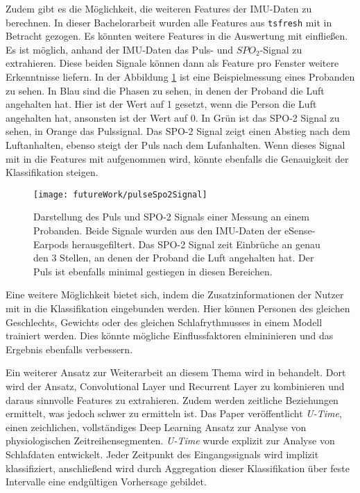 Zudem gibt es die Möglichkeit, die weiteren Features der IMU-Daten zu berechnen.
In dieser Bachelorarbeit wurden alle Features aus \texttt{tsfresh} mit in Betracht gezogen. 
Es könnten weitere Features in die Auswertung mit einfließen.
Es ist möglich, anhand der IMU-Daten das Puls- und $SPO_2$-Signal zu extrahieren. 
Diese beiden Signale können dann als Feature pro Fenster weitere Erkenntnisse liefern.
In der Abbildung \ref{futureWork:pulseSpo2} ist eine Beispielmessung eines Probanden zu sehen. 
In Blau sind die Phasen zu sehen, in denen der Proband die Luft angehalten hat.
Hier ist der Wert auf 1 gesetzt, wenn die Person die Luft angehalten hat, ansonsten ist der Wert auf 0. 
In Grün ist das SPO-2 Signal zu sehen, in Orange das Pulssignal. 
Das SPO-2 Signal zeigt einen Abstieg nach dem Luftanhalten, ebenso steigt der Puls nach dem Lufanhalten.
Wenn dieses Signal mit in die Features mit aufgenommen wird, könnte ebenfalls die Genauigkeit der Klassifikation steigen. 
\begin{figure}[ht]
    \centering
    \texttt{[image: futureWork/pulseSpo2Signal]}
    \caption{Darstellung des Puls und SPO-2 Signals einer Messung an einem Probanden. Beide Signale wurden aus den IMU-Daten der eSense-Earpods herausgefiltert. Das SPO-2 Signal zeit Einbrüche an genau den 3 Stellen, an denen der Proband die Luft angehalten hat. Der Puls ist ebenfalls minimal gestiegen in diesen Bereichen.}
    \label{futureWork:pulseSpo2}
\end{figure}

Eine weitere Möglichkeit bietet sich, indem die Zusatzinformationen der Nutzer mit in die Klassifikation eingebunden werden.
Hier können Personen des gleichen Geschlechts, Gewichts oder des gleichen Schlafrythmusses in einem Modell trainiert werden.
Dies könnte mögliche Einflussfaktoren elmininieren und das Ergebnis ebenfalls verbessern.

Ein weiterer Ansatz zur Weiterarbeit an diesem Thema wird in \cite{perslevUTimeFullyConvolutional2019} behandelt.
Dort wird der Ansatz, Convolutional Layer und Recurrent Layer zu kombinieren und daraus sinnvolle Features zu extrahieren. 
Zudem werden zeitliche Beziehungen ermittelt, was jedoch schwer zu ermitteln ist. 
Das Paper veröffentlicht \textit{U-Time}, einen zeichlichen, vollständiges Deep Learning Ansatz zur Analyse von physiologischen Zeitreihensegmenten. 
\textit{U-Time} wurde explizit zur Analyse von Schlafdaten entwickelt.
Jeder Zeitpunkt des Eingangssignals wird implizit klassifiziert, anschließend wird durch Aggregation dieser Klassifikation über feste Intervalle eine endgültigen Vorhersage gebildet.